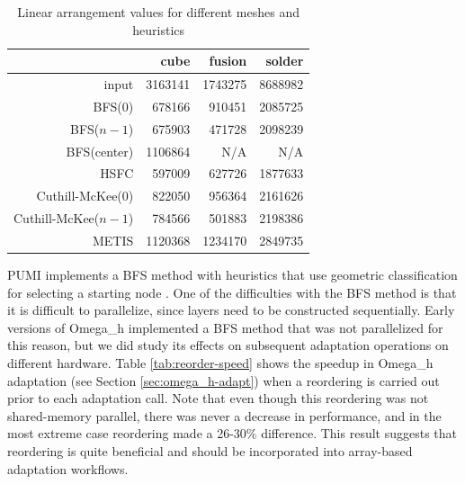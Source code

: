 \begin{table}
\caption{Linear arrangement values for different meshes and heuristics}
\label{tab:la}
\begin{center}
\begin{tabular}{r|rrr}
                     &    cube &   fusion &   solder \\\hline
input                & 3163141 &  1743275 &  8688982 \\
BFS($0$)             &  678166 &   910451 &  2085725 \\
BFS($n-1$)           &  675903 &   471728 &  2098239 \\
BFS(center)          & 1106864 &      N/A &      N/A \\
HSFC                 &  597009 &   627726 &  1877633 \\
Cuthill-McKee($0$)   &  822050 &   956364 &  2161626 \\
Cuthill-McKee($n-1$) &  784566 &   501883 &  2198386 \\
METIS                & 1120368 &  1234170 &  2849735 \\
\end{tabular}
\end{center}
\end{table}

PUMI implements a BFS method with heuristics that use geometric
classification for selecting a starting node
\cite{beall1997general,zhou2010adjacency}.
One of the difficulties with the BFS method is that it is difficult
to parallelize, since layers need to be constructed sequentially.
Early versions of Omega\_h implemented a BFS method that was not
parallelized for this reason, but we did study its effects on subsequent
adaptation operations on different hardware.
Table \ref{tab:reorder-speed} shows the speedup in Omega\_h adaptation
(see Section \ref{sec:omega_h-adapt}) when a reordering is carried out
prior to each adaptation call.
Note that even though this reordering was not shared-memory parallel,
there was never a decrease in performance, and in the most extreme case
reordering made a 26-30\% difference.
This result suggests that reordering is quite beneficial and should
be incorporated into array-based adaptation workflows.

